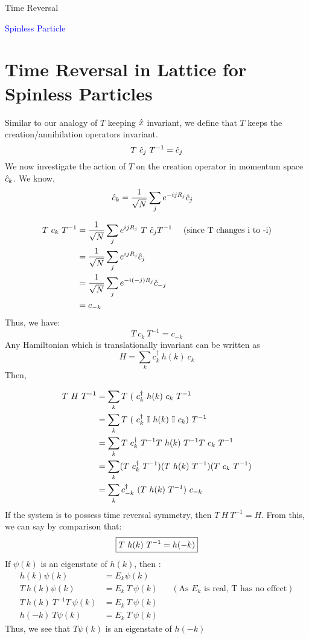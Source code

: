 \documentclass[12pt, oneside, listof=totoc,dvipsnames]{scrbook}
\begin{document}
\begin{chapter}{Time Reversal}
		\begin{center}
			\Large  \textcolor{blue}{Spinless Particle}
		\end{center}
		
		\section{Time Reversal in Lattice for Spinless Particles}
		
		Similar to our analogy of $T$ keeping $\hat{x}$ invariant, we define that $T$ keeps the creation/annihilation operators invariant.
		$$T\ \hat{c}_j \ T^{-1} = \hat{c}_j$$ We now investigate the action of $T$ on the creation operator in momentum space $\hat{c}_k$.
		We know, 
		\begin{align*}
			&\hat{c}_k = \frac{1}{\sqrt{N}}\sum \limits_j e^{-ijR_j}\hat{c}_j
		\end{align*}
		
		\begin{align*}
			T \ c_k \ T^{-1} &= \frac{1}{\sqrt{N}}\sum \limits_j e^{ijR_j}\ T\ \hat{c}_j T^{-1}\  &&\text{(since T changes i to -i)}\\
			&=\frac{1}{\sqrt{N}}\sum \limits_j e^{ijR_j}\hat{c}_j\\
			&=\frac{1}{\sqrt{N}}\sum \limits_j e^{-i(-j)R_j}\hat{c}_{-j}\\
			&=c_{-k}
		\end{align*}
		Thus, we have: 
		$$\boxed{ T \ c_k \ T^{-1}= c_{-k}}$$
		\noindent
		Any Hamiltonian which is translationally invariant can be written as $$H= \sum \limits_k c^\dagger_k \ h(k) \ c_k$$
		Then,
		
		\begin{align*}
			T \ H \ T^{-1}&=  \sum \limits_k  \tr{(\ c^\dagger_k \ h(k)\  c_k}\\
			&=  \sum \limits_k  \tr{(\ c^\dagger_k \ \mathbb{I}\ h(k)\ \mathbb{I}\ c_k)}\\
			&=\sum \limits_k  \tr{c^\dagger_k}\tr{h(k)}\tr{c_k}\\
			&=\sum \limits_k  (\tr{c^\dagger_k})(\tr{h(k)})(\tr{c_k})\\
			&=\sum \limits_k  c^\dagger_{-k}\ (\tr{h(k)})\ c_{-k}
		\end{align*}
		If the system is to possess time reversal symmetry, then $T \ H \ T^{-1} = H$. From this, we can say by comparison that: 
		$$\boxed{T\ h(k) \ T^{-1}=h(-k)}$$
		\noindent
		If $\psi(k)$ is an eigenstate of $h(k)$, then :
		\begin{align*}
			h(k)\psi(k)&=E_k\psi(k)\\
			T \ h(k) \psi(k) &= E_k \ T \ \psi(k) && (\text{As $E_k$ is real, T has no effect})\\
			T \ h(k) \ T^{-1}T \ \psi(k) &= E_k \ T \ \psi(k) \\
			h(-k) \ T\psi(k) &= E_k \ T \ \psi(k) 
		\end{align*}
		Thus, we see that $T\psi(k)$ is an eigenstate of $h(-k)$
		\noindent
		\begin{center}
		\end{center}
		

\end{chapter}
\end{document}
